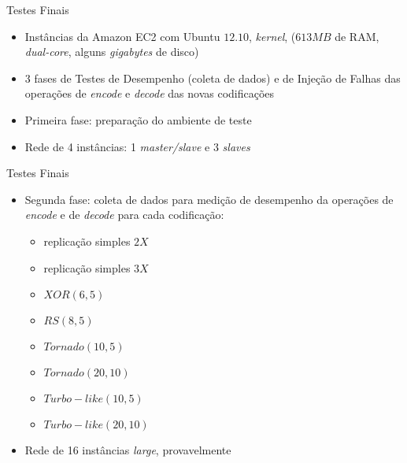   \begin{frame}{Testes Finais}

     \begin{itemize}
        \item<1-> Instâncias da Amazon EC2 com Ubuntu $12.10$,  \emph{kernel},  ($613MB$ de RAM, \emph{dual-core}, alguns \emph{gigabytes} de disco) 
        \item<2-> 3 fases de Testes de Desempenho (coleta de dados) e de Injeção de Falhas das operações de \emph{encode} e \emph{decode} das novas codificações
        \item<3-> Primeira fase: preparação do ambiente de teste
        \item<4-> Rede de 4 instâncias: 1 \emph{master/slave} e 3 \emph{slaves}
     \end{itemize}
  \end{frame}

  \begin{frame}{Testes Finais}
     \begin{itemize}
              \item<1-> Segunda fase: coleta de dados para medição de desempenho da operações de \emph{encode} e de \emph{decode} para cada codificação:
                  \begin{itemize}
                     \item replicação simples $2X$
                     \item replicação simples $3X$
                     \item $XOR(6,5)$
                     \item $RS(8,5)$
                     \item $Tornado(10,5)$
                     \item $Tornado(20,10)$
                     \item $Turbo-like(10,5)$
                     \item $Turbo-like(20,10)$
                 \end{itemize}
              \item<2-> Rede de 16 instâncias \emph{large}, provavelmente
     \end{itemize}
  \end{frame}

